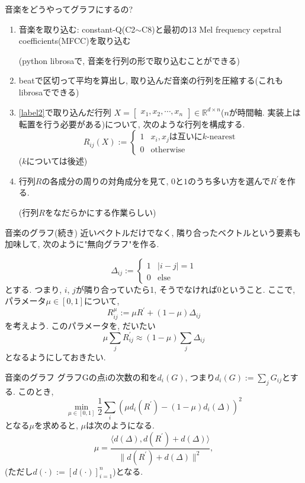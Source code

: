 \documentclass[dvipdfmx,11pt]{beamer}
\theoremstyle{definition}
\begin{document}
\begin{frame}{音楽をどうやってグラフにするの?}
\begin{enumerate}
\item 音楽を取り込む: constant-Q(C2$\sim$C8)と最初の13 Mel frequency cepstral coefficients(MFCC)を取り込む

(python librosaで, 音楽を行列の形で取り込むことができる)
\item\label{label2} beatで区切って平均を算出し, 取り込んだ音楽の行列を圧縮する(これもlibrosaでできる)
\item \ref{label2}で取り込んだ行列 $X=\begin{bmatrix}x_1, x_2, \cdots, x_n \end{bmatrix} \in \mathbb{R}^{d\times n}$($n$が時間軸. 実装上は転置を行う必要がある)について, 次のような行列を構成する.
$$R_{ij}(X) := 
\begin{cases}
1 & x_i, x_j \text{は互いに}k\text{-nearest} \\
0 & \text{otherwise}
\end{cases}$$
($k$については後述)
\item 行列$R$の各成分の周りの対角成分を見て, $0$と$1$のうち多い方を選んで$R^{\prime}$を作る.

(行列$R$をなだらかにする作業らしい)

\end{enumerate}
\end{frame}

\begin{frame}{音楽のグラフ(続き)}
近いベクトルだけでなく, 隣り合ったベクトルという要素も加味して, 次のように"無向グラフ"を作る.

$$ \Delta _{ij} :=
\begin{cases}
1 & |i - j | = 1 \\
0 & \text{else}
\end{cases}$$
とする. つまり, $i$, $j$が隣り合っていたら1, そうでなければ0ということ.
ここで, パラメータ$\mu \in [0, 1]$について,
$$R^{\mu} _{ij} := \mu R^{\prime} + (1-\mu)\Delta _{ij}$$
を考えよう. このパラメータを, だいたい
$$ \mu \displaystyle\sum _j R^{\prime} _{ij} \approx (1-\mu) \displaystyle\sum _j \Delta _{ij}$$
となるようにしておきたい. 
\end{frame}

\begin{frame}{音楽のグラフ}
グラフGの点iの次数の和を$d_i (G)$, つまり$d_i (G) := \sum _j G_{ij}$とする. このとき, 
$$\min _{\mu \in [0,1]} \dfrac{1}{2}\displaystyle\sum _i(\mu d_i (R^{\prime}) - (1 - \mu ) d_i (\Delta))^2$$ となる$\mu$を求めると, $\mu$は次のようになる.
$$ \mu = \dfrac{ \langle d(\Delta), d(R ^{\prime}) + d(\Delta) \rangle}{\| d(R ^{\prime}) + d(\Delta) \| ^2},$$
(ただし$d(\cdot) := [d(\cdot)]_{i=1} ^n$)となる.
\end{frame}
\end{document}
